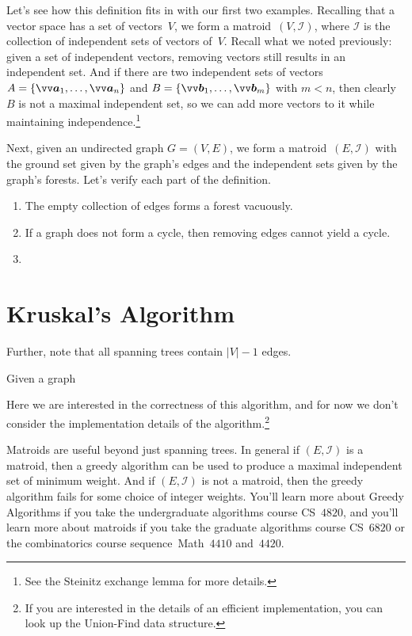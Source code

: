 \documentclass[twoside]{article}
\newcommand{\I}{\mathcal{I}}
\begin{document}
Let's see how this definition fits in with our first two examples.
Recalling that a vector space has a set of vectors~$V$, we form a matroid~$(V, \I)$, where $\I$ is the collection of independent sets of vectors of~$V$.
Recall what we noted previously: given a set of independent vectors, removing vectors still results in an independent set.
And if there are two independent sets of vectors ${A = \{\bv{a}_1, \ldots, \bv{a}_n\}}$ and ${B = \{\bv{b}_1, \ldots, \bv{b}_m\}}$ with ${m < n}$, then clearly $B$ is not a maximal independent set, so we can add more vectors to it while maintaining independence.\footnote{
  See the Steinitz exchange lemma for more details.
}

Next, given an undirected graph ${G = (V, E)}$, we form a matroid~$(E, \I)$ with the ground set given by the graph's edges and the independent sets given by the graph's forests.
Let's verify each part of the definition.
\begin{enumerate}
  \item The empty collection of edges forms a forest vacuously.
  \item If a graph does not form a cycle, then removing edges cannot yield a cycle.
  \item
\end{enumerate}

\section{Kruskal's Algorithm}

Further, note that all spanning trees contain ${|V| - 1}$ edges.


Given a graph


Here we are interested in the correctness of this algorithm, and for now we don't consider the implementation details of the algorithm.\footnote{
  If you are interested in the details of an efficient implementation, you can look up the Union-Find data structure.
}

Matroids are useful beyond just spanning trees.
In general if ${(E, \I)}$ is a matroid, then a greedy algorithm can be used to produce a maximal independent set of minimum weight.
And if ${(E, \I)}$ is not a matroid, then the greedy algorithm fails for some choice of integer weights.
You'll learn more about Greedy Algorithms if you take the undergraduate algorithms course CS~$4820$, and you'll learn more about matroids if you take the graduate algorithms course CS~$6820$ or the combinatorics course sequence~Math~$4410$ and~$4420$.
\end{document}
